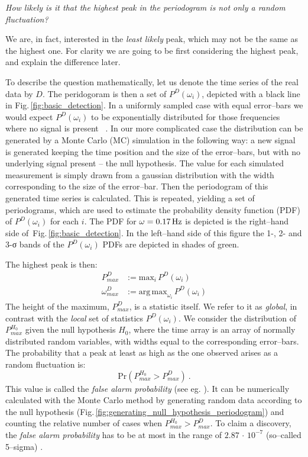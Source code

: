 \begin{center}
  \emph{How likely is it that the highest peak in the periodogram is not only a random fluctuation?}
\end{center}

We are, in fact, interested in the \emph{least likely} peak, which may not be the same as the highest one. For clarity we are going to be first considering the highest peak, and explain the difference later.

To describe the question mathematically, let us denote the time series of the real data by $D$. The peridogoram is then a set of $P^D(\omega_i)$, depicted with a black line in Fig.\,\ref{fig:basic_detection}. In a uniformly sampled case with equal error--bars we would expect $P^D(\omega_i)$ to be exponentially distributed for those frequencies where no signal is present ~\cite{Scargle1982}. In our more complicated case the distribution can be generated by a Monte Carlo (MC) simulation in the following way: a new signal is generated keeping the time position and the size of the error--bars, but with no underlying signal present -- the null hypothesis. The value for each simulated measurement is simply drawn from a gaussian distribution with the width corresponding to the size of the error--bar. Then the periodogram of this generated time series is calculated. This is repeated, yielding a set of periodograms, which are used to estimate the probability density function (PDF) of $P^D(\omega_i)$ for each $i$. The PDF for $\omega = \unit[0.17]{Hz}$ is depicted is the right--hand side of~Fig.\,\ref{fig:basic_detection}. In the left--hand side of this figure the 1-, 2- and 3-σ bands of the $P^D(\omega_i)$ PDFs are depicted in shades of green.

The highest peak is then:
\begin{align}
  P_{max}^D &:= \mathrm{max}_i\,P^D(\omega_i) \\
  \omega_{max}^D &:= \mathrm{arg\,max}_{\omega_i}\,P^D(\omega_i)
\end{align}
The height of the maximum, $P_{max}^D$, is a statistic itself. We refer to it as \emph{global}, in contrast with the \emph{local} set of statistics $P^D(\omega_i)$. We consider the distribution of $P_{max}^{H_0}$ given the null hypothesis $H_0$, where the time array is an array of normally distributed random variables, with widths equal to the corresponding error--bars. The probability that a peak at least as high as the one observed arises as a random fluctuation is:
\begin{equation}
  \mathrm{Pr}\left( P_{max}^{H_0} > P_{max}^D \right) \ .
\end{equation}
This value is called the \emph{false alarm probability} (see eg. \cite{Pandola2004}). It can be numerically calculated with the Monte Carlo method by generating random data according to the null hypothesis (Fig.\,\ref{fig:generating_null_hypothesis_periodogram}) and counting the relative number of cases when $P_{max}^{H_0} > P_{max}^D$. To claim a discovery, the \emph{false alarm probability} has to be at most in the range of $2.87\,\cdot\,10^{-7}$ (so--called 5--sigma) \cite{PDG2014}.

